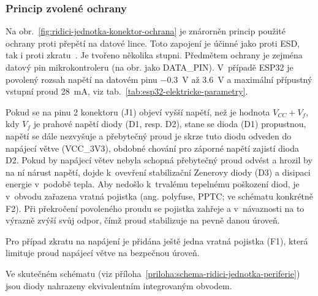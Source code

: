         \subsubsection{Princip zvolené ochrany}
        Na obr.~\ref{fig:ridici-jednotka-konektor-ochrana} je znárorněn princip použité ochrany proti přepětí na datové lince. Toto zapojení je účinné jako proti ESD, tak i proti zkratu~\cite{altium-esd-protection}. Je tvořeno několika stupni. Předmětem ochrany je zejména datový pin mikrokontroleru (na obr. jako DATA\_PIN). V~případě ESP32 je povolený rozsah napětí na datovém pinu \qty{-0.3}{V} až \qty{3.6}{V} a maximální přípustný vstupní proud \qty{28}{mA}, viz tab.~\ref{tab:esp32-elektricke-parametry}.

        Pokud se na pinu 2 konektoru (J1) objeví vyšší napětí, než je hodnota \(V_{CC} +V_{f} \), kdy \(V_{f} \) je prahové napětí diody (D1, resp. D2), stane se dioda (D1) propustnou, napětí se dále nezvyšuje a přebytečný proud je skrze tuto diodu odveden do napájecí větve (VCC\_3V3), obdobné chování pro záporné napětí zajistí dioda D2. Pokud by napájecí větev nebyla schopná přebytečný proud odvést a hrozil by na ní nárust napětí, dojde k~ovevření stabilizační Zenerovy diody (D3) a disipaci energie v~podobě tepla. Aby nedošlo k~trvalému tepelnému poškození diod, je v~obvodu zařazena vratná pojistka (ang. polyfuse, PPTC; ve schématu konkrétně F2). Při překročení povoleného proudu se pojistka zahřeje a v~návaznosti na to výrazně zvýší svůj odpor, čímž proud stabilizuje na pevně danou úroveň.

        Pro případ zkratu na napájení je přidána ještě jedna vratná pojistka (F1), která limituje proud napájecí větve na bezpečnou úroveň.

        Ve skutečném schématu (viz příloha~\ref{priloha:schema-ridici-jednotka-periferie}) jsou diody nahrazeny ekvivalentním integrovaným obvodem.

